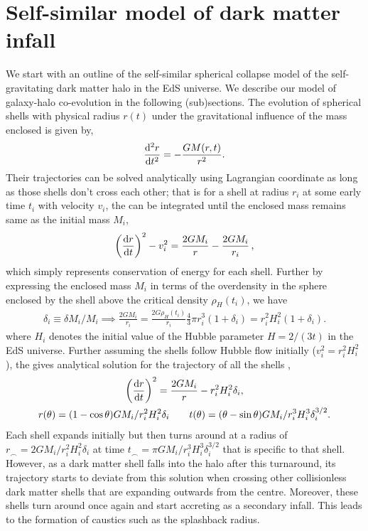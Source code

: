 \section{Self-similar model of dark matter infall}
\label{sec:methods-dm-ch:ssr}
We start with an outline of the self-similar spherical collapse model of the self-gravitating dark matter halo in the EdS universe. We describe our model of galaxy-halo co-evolution in the following (sub)sections. The evolution of spherical shells with physical radius $r(t)$ under the gravitational influence of the mass enclosed is given by, 
\begin{align}
\label{eq:dm_traj_phys_accl-ch:ssr}
\frac{{\rm d}^2 r}{{\rm d} t^2} = - \frac{GM(r,t)}{r^2}.
\end{align}
Their trajectories can be solved analytically using Lagrangian coordinate as long as those shells don't cross each other; that is for a shell at radius $r_i$ at some early time $t_i$ with velocity $v_i$, the  can be integrated until the enclosed mass remains same as the initial mass $M_i$,
\begin{align}
\label{eq:dm_traj_phys_ener-ch:ssr}
\left( \frac{{\rm d} r}{{\rm d} t} \right)^2 - v_i^2 = \frac{2GM_i}{r} - \frac{2GM_i}{r_i}\,,
\end{align}
which simply represents conservation of energy for each shell.
Further by expressing the enclosed mass $M_i$ in terms of the overdensity in the sphere enclosed by the shell above the critical density $\rho_H(t_i)$, we have
\begin{align}
\nonumber
\delta_i \equiv \delta M_i / M_i \implies \frac{2GM_i}{r_i} = \frac{2G \rho_H(t_i)}{r_i} \frac{4}{3}\pi r_i^3 (1+\delta_i) = r_i^2 H_i^2 (1+\delta_i).
\end{align}
where $H_i$ denotes the initial value of the Hubble parameter $H=2/(3t)$ in the EdS universe. Further assuming the shells follow Hubble flow initially
($v_i^2 = r_i^2 H_i^2$), 
the  gives analytical solution for the trajectory of all the shells \cite{1993paddy_strucformbook},
\begin{gather}
\left( \frac{{\rm d} r}{{\rm d} t} \right)^2 = \frac{2GM_i}{r} - r_i^2 H_i^2 \delta_i,\\
\label{eq:dm_traj_soln_phys-ch:ssr}
r(\theta) = (1 - \cos \theta) G M_i/r_i^2 H_i^2 \delta_i \qquad t(\theta) = (\theta - \sin \theta) G M_i/r_i^3 H_i^3 \delta_i^{3/2}.
\end{gather}
Each shell expands initially but then turns around at a radius of $r_{\smallfrown}= 2G M_i/r_i^2 H_i^2 \delta_i$ at time $t_{\smallfrown} = \pi G M_i/r_i^3 H_i^3 \delta_i^{3/2}$ that is specific to that shell. 
However, as a dark matter shell falls into the halo after this turnaround,
its trajectory starts to deviate from this solution when crossing other collisionless dark matter shells that are expanding outwards from the centre. 
Moreover, these shells turn around once again and start accreting as a secondary infall. This leads to the formation of caustics such as the splashback radius. 

